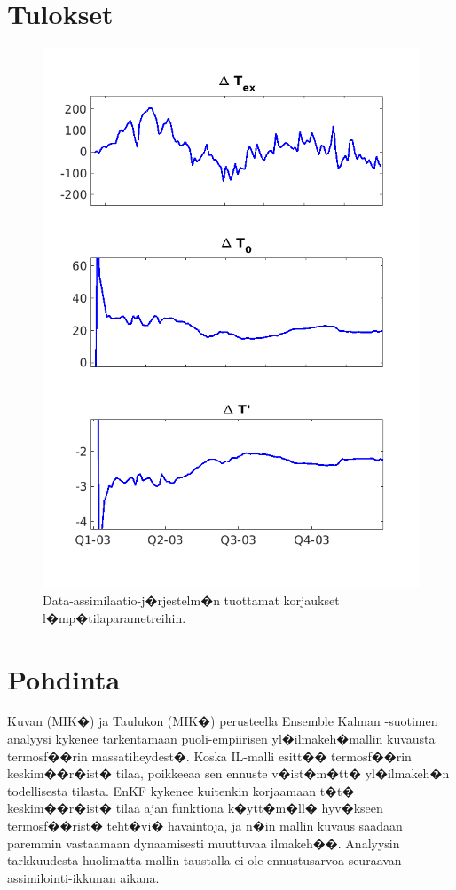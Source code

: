 \documentclass[12pt,a4paper,finnish,margin=2in]{article}
\begin{document}
\section{Tulokset}

\begin{figure}[t]
\centering
\includegraphics[scale = 0.6]{gradu_tempcorr}
\caption{Data-assimilaatio-j�rjestelm�n tuottamat korjaukset l�mp�tilaparametreihin. }
\label{fig:tempcorr}
\end{figure}

\section{Pohdinta}

Kuvan (MIK�) ja Taulukon (MIK�) perusteella Ensemble Kalman -suotimen analyysi kykenee tarkentamaan puoli-empiirisen yl�ilmakeh�mallin kuvausta termosf��rin massatiheydest�. Koska IL-malli esitt�� termosf��rin keskim��r�ist� tilaa, poikkeeaa sen ennuste v�ist�m�tt� yl�ilmakeh�n todellisesta tilasta. EnKF kykenee kuitenkin korjaamaan t�t� keskim��r�ist� tilaa ajan funktiona k�ytt�m�ll� hyv�kseen termosf��rist� teht�vi� havaintoja, ja n�in mallin kuvaus saadaan paremmin vastaamaan dynaamisesti muuttuvaa ilmakeh��. Analyysin tarkkuudesta huolimatta mallin taustalla ei ole ennustusarvoa seuraavan assimilointi-ikkunan aikana.
\end{document}
